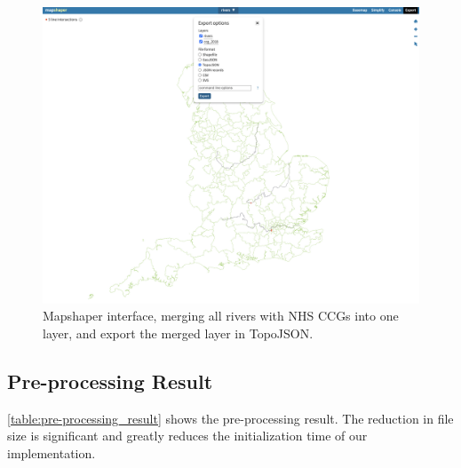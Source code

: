 {
    \begin{figure}[tbh!]
        \centering
        \includegraphics[width=\columnwidth]{figure/qgis/export_topojson.png}
        \caption{Mapshaper interface, merging all rivers with NHS CCGs into one layer, and export the merged layer in TopoJSON.}
        \label{fig:export_topojson}
    \end{figure}
}

\subsection{Pre-processing Result}

\autoref{table:pre-processing_result} shows the pre-processing result. The reduction in file size is significant and greatly reduces the initialization time of our implementation.

{
\renewcommand{\arraystretch}{1.5}
\begin{table}[!tb]
	\centering
	\caption{The file size is reduced by 88.5\% from the original size.}
	\label{table:pre-processing_result}
\end{table}
}

